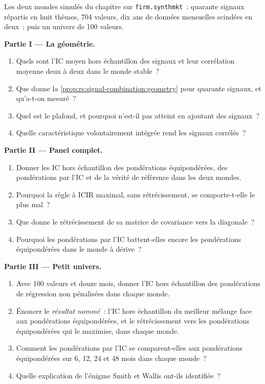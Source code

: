 \begin{problem}\label{pb:rs:signal-combination:1}
Les deux mondes simulés du chapitre sur \texttt{firm.synthmkt}~: quarante signaux répartis en huit thèmes, 704 valeurs, dix ans de données mensuelles scindées en deux~; puis
un univers de 100 valeurs.

\medskip\noindent\textbf{Partie I --- La géométrie.}
\begin{enumerate}
\item Quels sont l'IC moyen hors échantillon des signaux et leur corrélation moyenne deux à deux dans le monde stable~?
\item Que donne la \cref{prop:rs:signal-combination:geometry} pour quarante signaux, et qu'a-t-on mesuré~?
\item Quel est le plafond, et pourquoi n'est-il pas atteint en ajoutant des signaux~?
\item Quelle caractéristique volontairement intégrée rend les signaux corrélés~?
\end{enumerate}

\medskip\noindent\textbf{Partie II --- Panel complet.}
\begin{enumerate}[resume]
\item Donner les IC hors échantillon des pondérations équipondérées, des pondérations par l'IC et de la vérité de référence dans les deux mondes.
\item Pourquoi la règle à ICIR maximal, sans rétrécissement, se comporte-t-elle le plus mal~?
\item Que donne le rétrécissement de sa matrice de covariance vers la diagonale~?
\item Pourquoi les pondérations par l'IC battent-elles encore les pondérations équipondérées dans le monde à dérive~?
\end{enumerate}

\medskip\noindent\textbf{Partie III --- Petit univers.}
\begin{enumerate}[resume]
\item Avec 100 valeurs et douze mois, donner l'IC hors échantillon des pondérations de régression non pénalisées dans chaque monde.
\item Énoncer le \emph{résultat nommé}~: l'IC hors échantillon du meilleur mélange face aux pondérations équipondérées, et le rétrécissement vers les pondérations équipondérées qui
le maximise, dans chaque monde.
\item Comment les pondérations par l'IC se comparent-elles aux pondérations équipondérées sur 6, 12, 24 et 48 mois dans chaque monde~?
\item Quelle explication de l'énigme Smith et Wallis ont-ils identifiée~?
\end{enumerate}


\end{problem}

